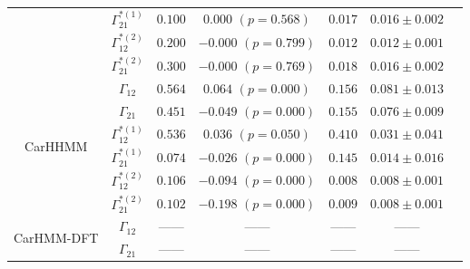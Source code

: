 \documentclass{article}
\begin{document}
\begin{center}
{\begin{tabular}{ccccccc}
                                     & $\Gamma^{*(1)}_{21}$          & $0.100$                         & $0.000$ $(p=0.568)$      & $0.017$                           & $0.016 \pm 0.002$                             \\
                                     & $\Gamma^{*(2)}_{12}$          & $0.200$                         & $-0.000$ $(p=0.799)$     & $0.012$                           & $0.012 \pm 0.001$                             \\
                                     & $\Gamma^{*(2)}_{21}$          & $0.300$                         & $-0.000$ $(p=0.769)$     & $0.018$                           & $0.016 \pm 0.002$                             \\ \hline
        \multirow{6}{*}{CarHHMM}     & $\Gamma_{12}$                 & $0.564$                         & $0.064$ $(p=0.000)$      & $0.156$                           & $0.081 \pm 0.013$                             \\
                                     & $\Gamma_{21}$                 & $0.451$                         & $-0.049$ $(p=0.000)$     & $0.155$                           & $0.076 \pm 0.009$                             \\
                                     & $\Gamma^{*(1)}_{12}$          & $0.536$                         & $0.036$ $(p=0.050)$      & $0.410$                           & $0.031 \pm 0.041$                             \\
                                     & $\Gamma^{*(1)}_{21}$          & $0.074$                         & $-0.026$ $(p=0.000)$     & $0.145$                           & $0.014 \pm 0.016$                             \\
                                     & $\Gamma^{*(2)}_{12}$          & $0.106$                         & $-0.094$ $(p=0.000)$     & $0.008$                           & $0.008 \pm 0.001$                             \\
                                     & $\Gamma^{*(2)}_{21}$          & $0.102$                         & $-0.198$ $(p=0.000)$     & $0.009$                           & $0.008 \pm 0.001$                             \\ \hline
        \multirow{6}{*}{CarHMM-DFT}  & $\Gamma_{12}$                 & ------                          & ------                   & ------                            & ------                                        \\
                                     & $\Gamma_{21}$                 & ------                          & ------                   & ------                            & ------                                        \\

\end{tabular}}
\end{center}
\end{document}
